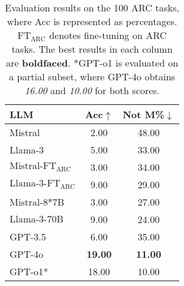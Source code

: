 \begin{table}[tb]
\small
\centering
\setlength{\tabcolsep}{4mm}
\begin{tabular}{lcc}
\toprule
\textbf{LLM} & \textbf{Acc}$\uparrow$ 
& \textbf{Not M\%}$\downarrow$ \\
\midrule
Mistral & 2.00 
& 48.00 \\
Llama-3 & 5.00 
& 33.00 \\
\midrule
$\text{Mistral-FT}_{\text{ARC}}$ & 3.00 
&34.00 \\
$\text{Llama-3-FT}_{\text{ARC}}$ & 9.00
& 29.00\\
\midrule
$\text{Mistral-8*7B}$ &3.00
& 27.00\\
$\text{Llama-3-70B}$ &9.00
& 24.00\\
\midrule
GPT-3.5 & 6.00 
& 35.00 \\
GPT-4o & \textbf{19.00} &\textbf{11.00} \\
\midrule
GPT-o1* & 18.00 & 10.00 \\
\bottomrule
\end{tabular}
\caption{Evaluation results on the 100 ARC tasks, where Acc %
is represented as percentages. $\text{FT}_{\text{ARC}}$ denotes fine-tuning on ARC tasks. The best results in each column are \textbf{boldfaced}. *GPT-o1 is evaluated on a partial subset, where GPT-4o obtains \emph{16.00} and \emph{10.00} for both scores.
}
\vspace{-0.2in}
\label{tab:arc performance}
\end{table}

